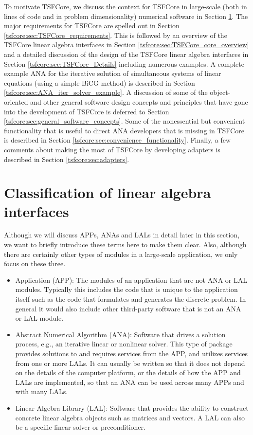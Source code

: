 To motivate TSFCore, we discuss the context for TSFCore in large-scale
(both in lines of code and in problem dimensionality) numerical
software in Section
{}\ref{tsfcore:sec:classification_of_lin_alg_itfc}.  The major
requirements for TSFCore are spelled out in Section
{}\ref{tsfcore:sec:TSFCore_requirements}.  This is followed by an
overview of the TSFCore linear algebra interfaces in Section
{}\ref{tsfcore:sec:TSFCore_core_overview} and a detailed discussion of
the design of the TSFCore linear algebra interfaces in Section
{}\ref{tsfcore:sec:TSFCore_Details} including numerous examples.  A
complete example ANA for the iterative solution of simultaneous
systems of linear equations (using a simple BiCG method) is described
in Section {}\ref{tsfcore:sec:ANA_iter_solver_example}.  A discussion
of some of the object-oriented and other general software design
concepts and principles that have gone into the development of TSFCore
is deferred to Section {}\ref{tsfcore:sec:general_software_concepts}.
Some of the nonessential but convenient functionality that is useful
to direct ANA developers that is missing in TSFCore is described in
Section {}\ref{tsfcore:sec:convenience_functionality}. Finally, a few
comments about making the most of TSFCore by developing adapters is
described in Section {}\ref{tsfcore:sec:adapters}.

%
\section{Classification of linear algebra interfaces}
\label{tsfcore:sec:classification_of_lin_alg_itfc}
%

Although we will discuss APPs, ANAs and LALs in detail later in this
section, we want to briefly introduce these terms here to make them
clear.  Also, although there are certainly other types of modules in a
large-scale application, we only focus on these three.
\begin{itemize}
\item Application (APP):  The modules of an application that are not
ANA or LAL modules.  Typically this includes the code that is unique
to the application itself such as the code that formulates and
generates the discrete problem.  In general it would also include
other third-party software that is not an ANA or LAL module.
\item Abstract Numerical Algorithm (ANA):  Software that drives a 
solution process, e.g., an iterative linear or nonlinear solver.  This
type of package provides solutions to and requires services from the
APP, and utilizes services from one or more LALs.  It can usually be
written so that it does not depend on the details of the computer
platform, or the details of how the APP and LALs are implemented, so
that an ANA can be used across many APPs and with many LALs.
\item Linear Algebra Library (LAL): Software that provides the 
ability to construct
concrete linear algebra objects such as matrices and vectors.  
A LAL can also be a specific linear solver or preconditioner.
\end{itemize}

